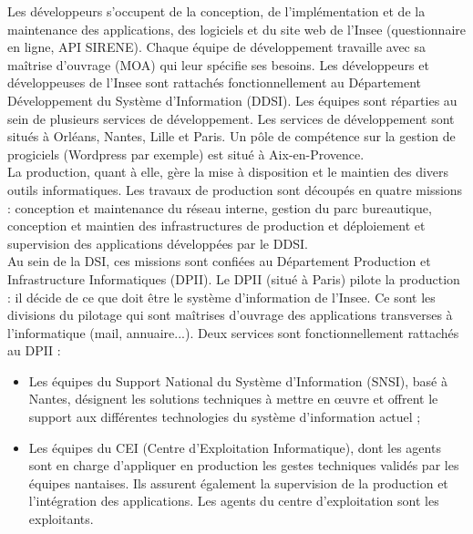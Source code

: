\documentclass[11pt,fleqn]{book} %
\begin{document}
Les développeurs s'occupent de la conception, de l'implémentation et de la maintenance des applications, des logiciels et du site web de l'Insee (questionnaire en ligne, API SIRENE). Chaque équipe de développement travaille avec sa maîtrise d'ouvrage (MOA) qui leur spécifie ses besoins. Les développeurs et développeuses de l’Insee sont rattachés fonctionnellement au Département Développement du Système d’Information (DDSI). Les équipes sont réparties au sein de plusieurs services de développement. Les services de développement sont situés à Orléans, Nantes, Lille et Paris. Un pôle de compétence sur la gestion de progiciels (Wordpress par exemple) est situé à Aix-en-Provence.\\

La production, quant à elle, gère la mise à disposition et le maintien des divers outils informatiques. Les travaux de production sont découpés en quatre missions : conception et maintenance du réseau interne, gestion du parc bureautique, conception et maintien des infrastructures de production et déploiement et supervision des applications développées par le DDSI. \\

Au sein de la DSI, ces missions sont confiées au Département Production et Infrastructure Informatiques (DPII). Le DPII (situé à Paris) pilote la production : il décide de ce que doit être le système d’information de l’Insee. Ce sont les divisions du pilotage qui sont maîtrises d’ouvrage des applications transverses à l’informatique (mail, annuaire...). Deux services sont fonctionnellement rattachés au DPII :
\begin{itemize}
    \item Les équipes du Support National du Système d’Information (SNSI), basé à Nantes,
désignent les solutions techniques à mettre en œuvre et offrent le support aux différentes
technologies du système d’information actuel ;
    \item Les équipes du CEI (Centre d’Exploitation Informatique), dont les agents sont en charge d’appliquer
en production les gestes techniques validés par les équipes nantaises. Ils assurent également
la supervision de la production et l’intégration des applications. Les agents du centre
d’exploitation sont les exploitants.\\
\end{itemize}
\end{document}
